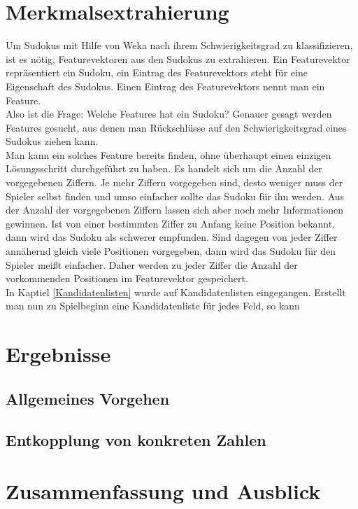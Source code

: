 \documentclass[accentcolor=tud6b,11pt,paper=a4]{tudreport}
\begin{document}
\chapter{Merkmalsextrahierung}
Um Sudokus mit Hilfe von Weka nach ihrem Schwierigkeitsgrad zu klassifizieren, ist es nötig, Featurevektoren aus den Sudokus zu extrahieren. Ein Featurevektor repräsentiert ein Sudoku, ein Eintrag des Featurevektors steht für eine Eigenschaft des Sudokus. Einen Eintrag des Featurevektors nennt man ein Feature.\\
Also ist die Frage: Welche Features hat ein Sudoku? Genauer gesagt werden Features gesucht, aus denen man Rückschlüsse auf den Schwierigkeitsgrad eines Sudokus ziehen kann.\\
Man kann ein solches Feature bereits finden, ohne überhaupt einen einzigen Lösungsschritt durchgeführt zu haben. Es handelt sich um die Anzahl der vorgegebenen Ziffern. Je mehr Ziffern vorgegeben sind, desto weniger muss der Spieler selbst finden und umso einfacher sollte das Sudoku für ihn werden. Aus der Anzahl der vorgegebenen Ziffern lassen sich aber noch mehr Informationen gewinnen. Ist von einer bestimmten Ziffer zu Anfang keine Position bekannt, dann wird das Sudoku als schwerer empfunden. Sind dagegen von jeder Ziffer annähernd gleich viele Positionen vorgegeben, dann wird das Sudoku für den Spieler meißt einfacher. Daher werden zu jeder Ziffer die Anzahl der vorkommenden Positionen im Featurevektor gespeichert.\\
In Kaptiel \ref{Kandidatenlisten} wurde auf Kandidatenlisten eingegangen. Erstellt man nun zu Spielbeginn eine Kandidatenliste für jedes Feld, so kann 






\chapter{Ergebnisse}
\section{Allgemeines Vorgehen}
\section{Entkopplung von konkreten Zahlen}

\chapter{Zusammenfassung und Ausblick}
\end{document}
